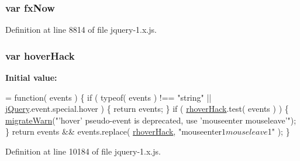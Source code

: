 \subsubsection[{\texorpdfstring{fx\+Now}{fxNow}}]{\setlength{\rightskip}{0pt plus 5cm}var fx\+Now}\hypertarget{jquery-1_8x_8js_a008b3271e2f410e89917bc6d96096296}{}\label{jquery-1_8x_8js_a008b3271e2f410e89917bc6d96096296}


Definition at line 8814 of file jquery-\/1.\+x.\+js.

\subsubsection[{\texorpdfstring{hover\+Hack}{hoverHack}}]{\setlength{\rightskip}{0pt plus 5cm}var hover\+Hack}\hypertarget{jquery-1_8x_8js_a645cef4bdf3fc1881c5272dacddb8917}{}\label{jquery-1_8x_8js_a645cef4bdf3fc1881c5272dacddb8917}
{\bfseries Initial value\+:}
\begin{DoxyCode}
= \textcolor{keyword}{function}( events ) \{
        \textcolor{keywordflow}{if} ( typeof( events ) !== \textcolor{stringliteral}{"string"} || \hyperlink{jquery-1_8x_8js_a2b1d6f9c448e3ce72f4e1865d6e38d2c}{jQuery}.event.special.hover ) \{
            \textcolor{keywordflow}{return} events;
        \}
        \textcolor{keywordflow}{if} ( \hyperlink{jquery-1_8x_8js_a7b035462889195e00316a894a2b3d876}{rhoverHack}.test( events ) ) \{
            \hyperlink{jquery-1_8x_8js_ac6036b3100bb484f96bfb15165e077f9}{migrateWarn}(\textcolor{stringliteral}{"'hover' pseudo-event is deprecated, use 'mouseenter mouseleave'"});
        \}
        \textcolor{keywordflow}{return} events && events.replace( \hyperlink{jquery-1_8x_8js_a7b035462889195e00316a894a2b3d876}{rhoverHack}, \textcolor{stringliteral}{"mouseenter$1 mouseleave$1"} );
    \}
\end{DoxyCode}


Definition at line 10184 of file jquery-\/1.\+x.\+js.

